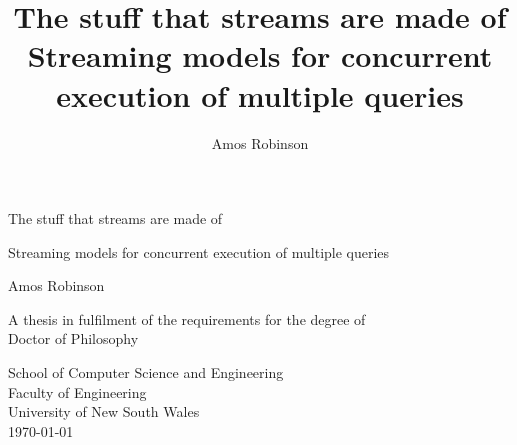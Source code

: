 \thispagestyle{empty}
\title{
  {The stuff that streams are made of} \\
  {\Large Streaming models for concurrent execution of multiple queries} \\
  }

\author{Amos Robinson}


\begin{titlepage}
    \begin{center}
        \vspace*{1cm}
        
        { \LARGE The stuff that streams are made of }
        \Large
        
        \vspace{0.5cm}
        Streaming models for concurrent execution of multiple queries
        
        \vspace{1.5cm}
        
        Amos Robinson
        
        \vfill

      A thesis in fulfilment of the requirements for the degree of \\
      Doctor of Philosophy
        
        \vspace{0.8cm}

        School of Computer Science and Engineering\\
        Faculty of Engineering \\
        University of New South Wales\\
        \today
    \end{center}
\end{titlepage}
